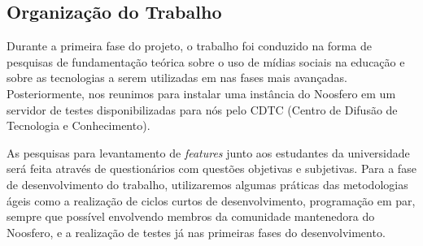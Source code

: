 
\subsection{Organização do Trabalho}

Durante a primeira fase do projeto, o trabalho foi conduzido na forma de
pesquisas de fundamentação teórica sobre o uso de mídias sociais na educação
e sobre as tecnologias a serem utilizadas em nas fases mais avançadas.
Posteriormente, nos reunimos para instalar uma instância do Noosfero em um
servidor de testes disponibilizadas para nós pelo CDTC (Centro de Difusão de
Tecnologia e Conhecimento). 

As pesquisas para levantamento de \textit{features} junto aos estudantes
da universidade será feita através de questionários com questões objetivas
e subjetivas.
%
Para a fase de desenvolvimento do trabalho, utilizaremos algumas práticas das
metodologias ágeis como a realização de ciclos curtos de desenvolvimento,
programação em par, sempre que possível envolvendo membros da comunidade
mantenedora do Noosfero, e a realização de testes já nas primeiras fases do
desenvolvimento.
